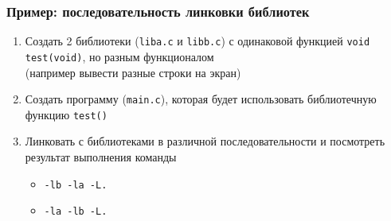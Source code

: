 \begin{frame}
	\frametitle{Пример: последовательность линковки библиотек}

	\begin{enumerate}
		\item Создать 2 библиотеки ({\tt liba.c} и {\tt libb.c})
			с одинаковой функцией {\tt void test(void)}, но разным функционалом\\
			(например вывести разные строки на экран)
		\item Создать программу ({\tt main.c}), которая будет использовать 
			библиотечную функцию {\tt test()}
		\item Линковать с библиотеками в различной последовательности и 
			посмотреть результат выполнения команды
			\begin{itemize}
				\item {\tt -lb -la -L.}
				\item {\tt -la -lb -L.}
			\end{itemize}
	\end{enumerate}
\end{frame}
